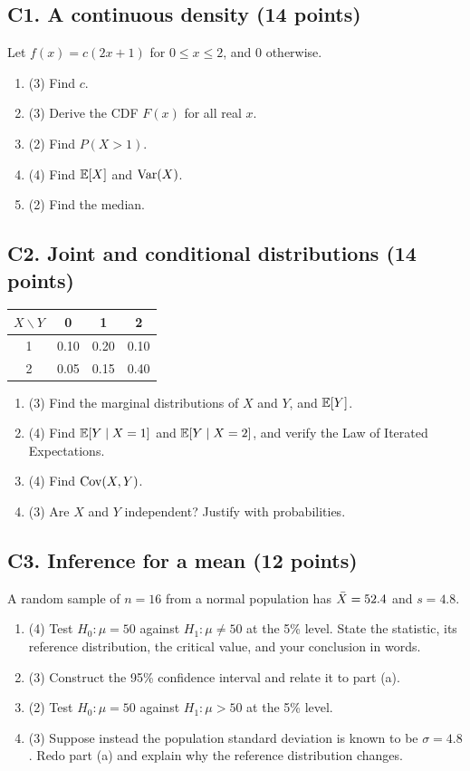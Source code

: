 \documentclass[11pt]{article}
\begin{document}
\subsection{C1. A continuous density (14 points)}
Let $f(x)=c(2x+1)$ for $0\le x\le2$, and $0$ otherwise.
\begin{enumerate}[label=(\alph*)]
\item (3) Find $c$.
\item (3) Derive the CDF $F(x)$ for all real $x$.
\item (2) Find $P(X>1)$.
\item (4) Find $\mathbb{E}[X]$ and $\operatorname{Var}(X)$.
\item (2) Find the median.
\end{enumerate}

\subsection{C2. Joint and conditional distributions (14 points)}
\begin{center}
\begin{tabular}{c|ccc}
$X\backslash Y$ & 0 & 1 & 2 \\ \hline
1 & 0.10 & 0.20 & 0.10 \\
2 & 0.05 & 0.15 & 0.40
\end{tabular}
\end{center}
\begin{enumerate}[label=(\alph*)]
\item (3) Find the marginal distributions of $X$ and $Y$, and $\mathbb{E}[Y]$.
\item (4) Find $\mathbb{E}[Y\mid X=1]$ and $\mathbb{E}[Y\mid X=2]$, and verify the Law of Iterated Expectations.
\item (4) Find $\operatorname{Cov}(X,Y)$.
\item (3) Are $X$ and $Y$ independent? Justify with probabilities.
\end{enumerate}

\subsection{C3. Inference for a mean (12 points)}
A random sample of $n=16$ from a normal population has $\bar{X}=52.4$ and $s=4.8$.
\begin{enumerate}[label=(\alph*)]
\item (4) Test $H_0:\mu=50$ against $H_1:\mu\ne50$ at the 5\% level. State the statistic, its reference distribution, the critical value, and your conclusion in words.
\item (3) Construct the 95\% confidence interval and relate it to part (a).
\item (2) Test $H_0:\mu=50$ against $H_1:\mu>50$ at the 5\% level.
\item (3) Suppose instead the population standard deviation is known to be $\sigma=4.8$. Redo part (a) and explain why the reference distribution changes.
\end{enumerate}
\end{document}
